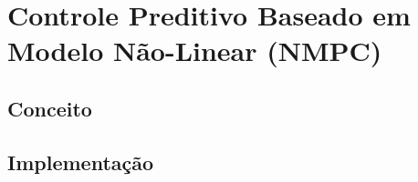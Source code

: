 \section{Controle Preditivo Baseado em Modelo Não-Linear (NMPC)}
\subsection{Conceito}


\subsection{Implementação}


